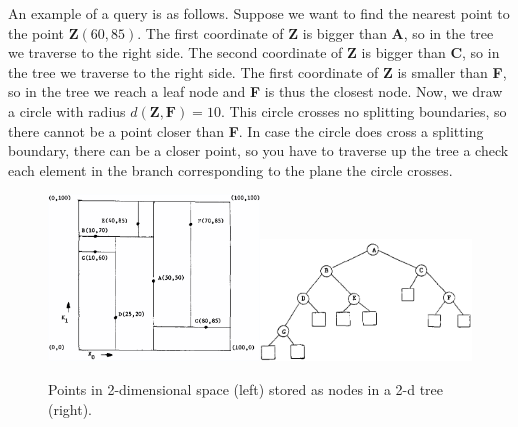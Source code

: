 An example of a query is as follows.
Suppose we want to find the nearest point to the point \textbf{Z}\((60, 85)\).
The first coordinate of \textbf{Z} is bigger than \textbf{A}, so in the tree we traverse to the right side.
The second coordinate of \textbf{Z} is bigger than \textbf{C}, so in the tree we traverse to the right side.
The first coordinate of \textbf{Z} is smaller than \textbf{F}, so in the tree we reach a leaf node and \textbf{F} is thus the closest node.
Now, we draw a circle with radius \(d(\textbf{Z}, \textbf{F}) = 10\).
This circle crosses no splitting boundaries, so there cannot be a point closer than \textbf{F}.
In case the circle does cross a splitting boundary, there can be a closer point, so you have to traverse up the tree a check each element in the branch corresponding to the plane the circle crosses.
\begin{figure}[H]
    \centering
    \includegraphics[width = 0.5\textwidth]{images/plane}\includegraphics[width = 0.5\textwidth]{images/tree}
    \caption{Points in 2-dimensional space (left) stored as nodes in a 2-d tree (right).}\label{fig:tree}
\end{figure}

